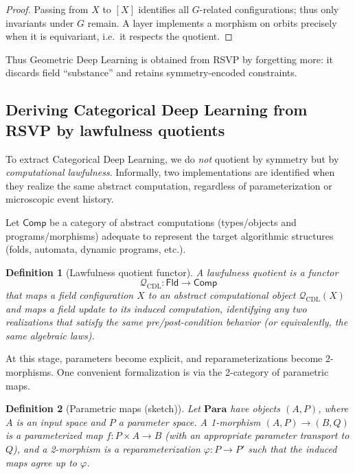 \documentclass[11pt]{article}
\newtheorem{definition}{Definition}
\begin{document}
\begin{proof}
Passing from $X$ to $[X]$ identifies all $G$-related configurations; thus only
invariants under $G$ remain. A layer implements a morphism on orbits precisely
when it is equivariant, i.e.\ it respects the quotient.
\end{proof}

Thus Geometric Deep Learning is obtained from RSVP by forgetting more: it discards
field ``substance'' and retains symmetry-encoded constraints.

\subsection{Deriving Categorical Deep Learning from RSVP by lawfulness quotients}

To extract Categorical Deep Learning, we do \emph{not} quotient by symmetry but by
\emph{computational lawfulness}. Informally, two implementations are identified
when they realize the same abstract computation, regardless of parameterization
or microscopic event history.

Let $\mathsf{Comp}$ be a category of abstract computations (types/objects and
programs/morphisms) adequate to represent the target algorithmic structures (folds,
automata, dynamic programs, etc.).

\begin{definition}[Lawfulness quotient functor]
A \emph{lawfulness quotient} is a functor
\[
\mathcal{Q}_{\mathrm{CDL}} : \mathsf{Fld} \to \mathsf{Comp}
\]
that maps a field configuration $X$ to an abstract computational object
$\mathcal{Q}_{\mathrm{CDL}}(X)$ and maps a field update to its induced computation,
identifying any two realizations that satisfy the same pre/post-condition behavior
(or equivalently, the same algebraic laws).
\end{definition}

At this stage, parameters become explicit, and reparameterizations become
2-morphisms. One convenient formalization is via the 2-category of parametric maps.

\begin{definition}[Parametric maps (sketch)]
Let $\mathbf{Para}$ have objects $(A,P)$, where $A$ is an input space and $P$ a
parameter space. A 1-morphism $(A,P)\to(B,Q)$ is a parameterized map
$f:P\times A\to B$ (with an appropriate parameter transport to $Q$), and a
2-morphism is a reparameterization $\varphi:P\to P'$ such that the induced maps
agree up to $\varphi$.
\end{definition}
\end{document}
